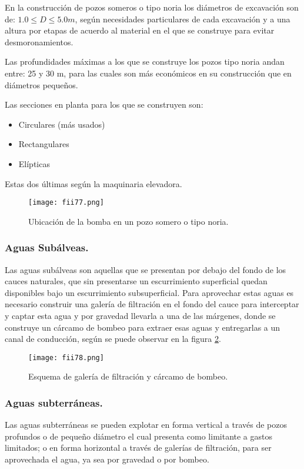 En la construcción de pozos someros o tipo noria los diámetros de excavación
son de: $1.0 \leq  D \leq  5.0 m$, según necesidades particulares de cada excavación y a una
altura por etapas de acuerdo al material en el que se construye para evitar
desmoronamientos.

Las profundidades máximas a los que se construye los pozos tipo noria andan
entre: 25 y 30 m, para las cuales son más económicos en su construcción que en
diámetros pequeños.

Las secciones en planta para los que se construyen son:
\begin{itemize}
	\item Circulares (más usados)
	\item Rectangulares
	\item Elípticas
\end{itemize}

Estas dos últimas según la maquinaria elevadora.

\begin{figure}[h!]
	\centerline{\texttt{[image: fii77.png]}}
	\caption{Ubicación de la bomba en un pozo somero o tipo noria.}
	\label{fii77}
\end{figure}


\subsubsection{Aguas Subálveas.}
Las aguas subálveas son aquellas que se presentan por debajo del fondo de los cauces naturales, que sin presentarse un escurrimiento superficial quedan disponibles bajo un escurrimiento subsuperficial. Para aprovechar estas aguas es necesario construir una galería de filtración en el fondo del cauce para interceptar y captar esta agua y por gravedad llevarla a una de las márgenes, donde se construye un cárcamo de bombeo para extraer esas aguas y entregarlas a un canal de conducción, según se puede observar en la figura \ref{fii78}.

\begin{figure}[h!]
	\centerline{\texttt{[image: fii78.png]}}
	\caption{Esquema de galería de filtración y cárcamo de bombeo.}
	\label{fii78}
\end{figure}

\subsubsection{Aguas subterráneas.}
Las aguas subterráneas se pueden explotar en forma vertical a través de pozos
profundos o de pequeño diámetro el cual presenta como limitante a gastos limitados; o
en forma horizontal a través de galerías de filtración, para ser aprovechada el agua, ya
sea por gravedad o por bombeo.

